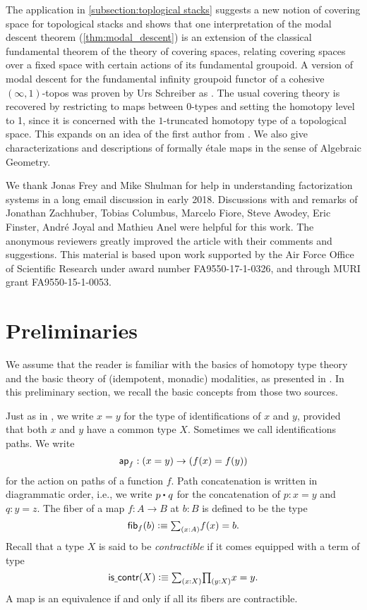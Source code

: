 \documentclass[9pt,twosided]{amsart}
\begin{document}
The application in \cref{subsection:toplogical stacks} suggests a new notion of covering space for topological stacks and shows that
one interpretation of the modal descent theorem (\cref{thm:modal_descent}) is an extension of the classical fundamental theorem of the theory of covering spaces,
relating covering spaces over a fixed space with certain actions of its fundamental groupoid.
A version of modal descent for the fundamental infinity groupoid functor of a cohesive $(\infty,1)$-topos was proven by Urs Schreiber as \cite[Proposition 5.2.42]{SchreiberDcct}.
The usual covering theory is recovered by restricting to maps between $0$-types and setting the homotopy level to 1,
since it is concerned with the $1$-truncated homotopy type of a topological space.
This expands on an idea of the first author from \cite{wellen-oxford-abstract}.
We also give characterizations and descriptions of formally étale maps in the sense of Algebraic Geometry.
  
We thank Jonas Frey and Mike Shulman for help in understanding factorization systems in a long email discussion in early 2018.
Discussions with and remarks of Jonathan Zachhuber, Tobias Columbus, Marcelo Fiore, Steve Awodey, Eric Finster, André Joyal and Mathieu Anel were helpful for this work.
The anonymous reviewers greatly improved the article with their comments and suggestions. 
This material is based upon work supported by the Air Force Office of Scientific Research under award number FA9550-17-1-0326, and through MURI grant FA9550-15-1-0053.


\section{Preliminaries}
We assume that the reader is familiar with the basics of homotopy type theory \cite{UFP} and the basic theory of (idempotent, monadic) modalities, as presented in \cite{RijkeSpittersShulman}. In this preliminary section, we recall the basic concepts from those two sources.

Just as in \cite{UFP}, we write $x=y$ for the type of identifications of $x$ and $y$, provided that both $x$ and $y$ have a common type $X$. Sometimes we call identifications paths. We write
\begin{equation*}
  \mathsf{ap}_{f}:(x=y)\to (f(x)=f(y))
\end{equation*}
for the action on paths of a function $f$. Path concatenation is written in diagrammatic order, i.e., we write $\ct{p}{q}$ for the concatenation of $p:x=y$ and $q:y=z$. The fiber of a map $f:A\to B$ at $b:B$ is defined to be the type
\begin{equation*}
  \fib{f}{b}\defeq \sm{x:A}f(x)=b.
\end{equation*}
Recall that a type $X$ is said to be \emph{contractible} if it comes equipped with a term of type
\begin{equation*}
  \iscontr(X)\defeq \sm{x:X}\prd{y:X}x=y.
\end{equation*}
A map is an equivalence if and only if all its fibers are contractible.
\end{document}
